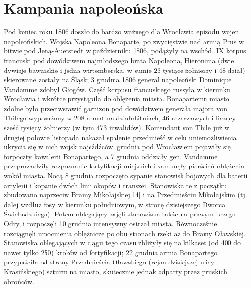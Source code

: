 \documentclass{article}
\begin{document}
\section{Kampania napoleońska}
\vspace{3mm} %
\newline Pod koniec roku 1806 doszło do bardzo ważnego dla Wrocławia epizodu wojen napoleońskich. Wojska Napoleona Bonaparte, po zwycięstwie nad armią Prus w bitwie pod Jeną-Auerstedt w październiku 1806, podążyły na wschód. IX korpus francuski pod dowództwem najmłodszego brata Napoleona, Hieronima (dwie dywizje bawarskie i jedna wirtemberska, w sumie 23 tysiące żołnierzy i 48 dział) skierowane zostały na Śląsk; 3 grudnia 1806 generał napoleoński Dominique Vandamme zdobył Głogów. Część korpusu francuskiego ruszyła w kierunku Wrocławia i wkrótce przystąpiła do oblężenia miasta. Bonapartemu miasto zdolne było przeciwstawić garnizon pod dowództwem generała majora von Thilego wyposażony w 208 armat na działobitniach, 46 rezerwowych i liczący sześć tysięcy żołnierzy (w tym 473 inwalidów). Komendant von Thile już w drugiej połowie listopada nakazał spalenie przedmieść w celu uniemożliwienia ukrycia się w nich wojsk najeźdźców.
\vspace{3mm} %
 grudnia pod Wrocławiem pojawiły się forpoczty kawalerii Bonapartego, a 7 grudnia oddziały gen. Vandamme przeprowadziły rozpoznanie fortyfikacji miejskich i zamknęły pierścień oblężenia wokół miasta. Nocą 8 grudnia rozpoczęto sypanie stanowisk bojowych dla baterii artylerii i kopanie dwóch linii okopów i transzei. Stanowiska te z początku zbudowano naprzeciw Bramy Mikołajskiej[14] i na Przedmieściu Mikołajskim (tj. dalej wzdłuż fosy w kierunku południowym, w stronę dzisiejszego Dworca Świebodzkiego). Potem oblegający zajęli stanowiska także na prawym brzegu Odry, i rozpoczęli 10 grudnia intensywny ostrzał miasta. Równocześnie rozciągnęli umocnienia oblężnicze po obu stronach rzeki aż do Bramy Oławskiej. Stanowiska oblegających w ciągu tego czasu zbliżyły się na kilkaset (od 400 do nawet tylko 250) kroków od fortyfikacji; 22 grudnia armia Bonapartego przypuściła od strony Przedmieścia Oławskiego (rejon dzisiejszej ulicy Krasińskiego) szturm na miasto, skutecznie jednak odparty przez pruskich obrońców.
\vspace{3mm} %
\end{document}
